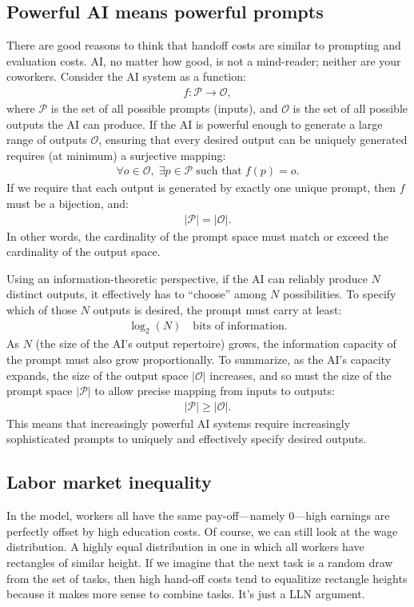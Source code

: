 \documentclass{article}
\theoremstyle{plain}
\theoremstyle{plain}
\begin{document}
\subsection{Powerful AI means powerful prompts}
There are good reasons to think that handoff costs are similar to prompting and evaluation costs.
AI, no matter how good, is not a mind-reader; neither are your coworkers.
Consider the AI system as a function:
\begin{align}
f : \mathcal{P} \longrightarrow \mathcal{O},
\end{align}
where $\mathcal{P}$ is the set of all possible prompts (inputs), and $\mathcal{O}$ is the set of all possible outputs the AI can produce.
If the AI is powerful enough to generate a large range of outputs $\mathcal{O}$, ensuring that every desired output can be uniquely generated requires (at minimum) a surjective mapping:
\begin{align}
\forall o \in \mathcal{O}, \; \exists p \in \mathcal{P} \; \text{such that} \; f(p) = o.
\end{align}
If we require that each output is generated by exactly one unique prompt, then $f$ must be a bijection, and:
\begin{align}
|\mathcal{P}| = |\mathcal{O}|.
\end{align}
In other words, the cardinality of the prompt space must match or exceed the cardinality of the output space.

Using an information-theoretic perspective, if the AI can reliably produce $N$ distinct outputs, it effectively has to ``choose'' among $N$ possibilities. 
To specify which of those $N$ outputs is desired, the prompt must carry at least:
\begin{align}
\log_2(N) \quad \text{bits of information.}
\end{align}
As $N$ (the size of the AI's output repertoire) grows, the information capacity of the prompt must also grow proportionally.
To summarize, as the AI’s capacity expands, the size of the output space $|\mathcal{O}|$ increases, and so must the size of the prompt space $|\mathcal{P}|$ to allow precise mapping from inputs to outputs:
\begin{align}
|\mathcal{P}| \geq |\mathcal{O}|.
\end{align}
This means that increasingly powerful AI systems require increasingly sophisticated prompts to uniquely and effectively specify desired outputs.

\subsection{Labor market inequality}
In the model, workers all have the same pay-off---namely $0$---high earnings are perfectly offset by high education costs.
Of course, we can still look at the wage distribution.
A highly equal distribution in one in which all workers have rectangles of similar height.
If we imagine that the next task is a random draw from the set of tasks, then high hand-off costs tend to equalitize rectangle heights because it makes more sense to combine tasks. 
It's just a LLN argument.
\end{document}
